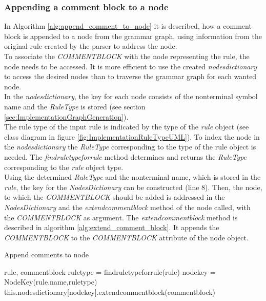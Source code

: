\subsubsection{Appending a comment block to a node}\label{sec:ImplementationMaintainingCommentBlockWithNodes}

In Algorithm \ref{alg:append_comment_to_node} it is described, how a comment block is appended to a node from the grammar graph, using information from the original rule created by the parser to address the node.\\
To associate the \textit{COMMENT\textunderscore BLOCK} with the node representing the rule, the node needs to be accessed.
It is more efficient to use the created \textit{nodes\textunderscore dictionary} to access the desired nodes than to traverse the grammar graph for each wanted node.\\
In the \textit{nodes\textunderscore dictionary}, the key for each node consists of the nonterminal symbol name and the \textit{RuleType} is stored (see section \ref{sec:ImplementationGraphGeneration}).\\
The rule type of the input rule is indicated by the type of the \textit{rule} object (see class diagram in figure \ref{fig:ImplementationRuleTypeUML}).
To index the node in the \textit{nodes\textunderscore dictionary} the \textit{RuleType} corresponding to the type of the rule object is needed.
The \textit{find\textunderscore rule\textunderscore type\textunderscore for\textunderscore rule} method determines and returns the \textit{RuleType} corresponding to the \textit{rule} object type.\\
Using the determined \textit{RuleType} and the nonterminal name, which is stored in the \textit{rule}, the key for the \textit{Nodes\textunderscore Dictionary} can be constructed (line 8).
Then, the node, to which the \textit{COMMENT\textunderscore BLOCK} should be added is addressed in the \textit{Nodes\textunderscore Dictionary} and the \textit{extend\textunderscore comment\textunderscore block} method of the node called, with the \textit{COMMENT\textunderscore BLOCK} as argument.
The \textit{extend\textunderscore comment\textunderscore block} method is described in algorithm \ref{alg:extend_comment_block}.
It appends the \textit{COMMENT\textunderscore BLOCK} to the \textit{COMMENT\textunderscore BLOCK} attribute of the node object.

\begin{algorithm}[H]
\small
\caption{Append comments to node}
\begin{algorithmic}[1]
\algrenewcommand\algorithmicindent{0.4em}
\Require rule, comment\textunderscore block
\State rule\textunderscore type = find\textunderscore rule\textunderscore type\textunderscore for\textunderscore rule(rule)
\State node\textunderscore key = Node\textunderscore Key(rule.name,rule\textunderscore type)
\State this.nodes\textunderscore dictionary[node\textunderscore key].extend\textunderscore comment\textunderscore block(comment\textunderscore block)
\end{algorithmic}
\label{alg:append_comment_to_node}
\end{algorithm}

